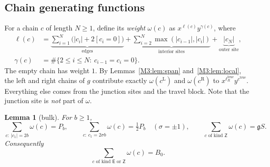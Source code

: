 \documentclass[11pt]{article}
\theoremstyle{plain}
\newtheorem{lemma}[theorem]{Lemma}
\theoremstyle{definition}
\theoremstyle{remark}
\begin{document}
\subsection{Chain generating functions}\label{app:chains}

For a chain $c$ of length $N\ge1$, define its \emph{weight} $\omega(c)$ as $x^{\ell(c)}y^{\gamma(c)}$,
where
\begin{align*}
  \ell(c)&=\underbrace{\sum_{i=1}^{N}\bigl(|c_i|+2[c_i=0]\bigr)}_{\text{edges}}
          +\underbrace{\sum_{i=2}^{N}\max(|c_{i-1}|,|c_i|)}_{\text{interior sites}}
          +\underbrace{|c_N|}_{\text{outer site}},\\
  \gamma(c)&=\#\{2\le i\le N:\ c_{i-1}=c_i=0\}.
\end{align*}
The empty chain has weight $1$. By Lemmas~\ref{M3:lem:span} and~\ref{M3:lem:local}, the left and
right chains of $g$ contribute exactly $\omega(c^{\mathrm L})$ and $\omega(c^{\mathrm R})$ to
$x^{\ell_R^{\mathrm{true}}}y^{c^{\mathrm{true}}}$. Everything else comes from the junction
sites and the travel block. Note that the junction site is \emph{not} part of $\omega$.

\begin{lemma}[bulk]\label{M3:lem:bulk}
For $b\ge1$,
\[
  \sum_{c:\ |c_1|=2b}\omega(c)=P_b,\qquad
  \sum_{c:\ c_1=2\sigma b}\omega(c)=\tfrac12P_b\quad(\sigma=\pm1),\qquad
  \sum_{c\text{ of kind }\mathsf Z}\omega(c)=\mathfrak gS .
\]
Consequently
\[
  \sum_{c\text{ of kind }\mathsf E\text{ or }\mathsf Z}\omega(c)=B_0 .
\]
\end{lemma}
\end{document}
